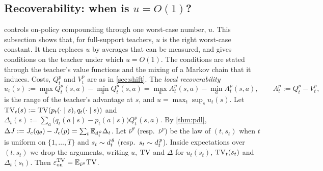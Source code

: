 \subsection{Recoverability: when is \texorpdfstring{$u=O(1)$}{u=O(1)}?}\label{sec:recoverability}

 controls on-policy compounding through one worst-case number, $u$. This subsection shows that,
for full-support teachers, $u$ is the right worst-case constant. It then replaces $u$ by averages that can be
measured, and gives conditions on the teacher under which $u=O(1)$. The conditions are stated through the
teacher's value functions and the mixing of a Markov chain that it induces. Costs, $Q^p_t$ and $V^p_t$ are as in
\cref{sec:shift}. The \emph{local recoverability}
\[
u_t(s):=\max_aQ^p_t(s,a)-\min_aQ^p_t(s,a)=\max_aA^p_t(s,a)-\min_aA^p_t(s,a),\qquad A^p_t:=Q^p_t-V^p_t,
\]
is the range of the teacher's advantage at $s$, and $u=\max_t\sup_su_t(s)$. Let
$\mathrm{TV}_t(s):=\mathrm{TV}(p_t(\cdot\mid s),q_t(\cdot\mid s))$ and $\Delta_t(s):=\sum_a\big(q_t(a\mid s)-p_t(a\mid s)\big)Q^p_t(s,a)$. By
\cref{thm:pdl}, $\Delta J:=J_c(q_\theta)-J_c(p)=\sum_t\mathbb{E}_{d^{\,\theta}_{t}}\Delta_t$. Let $\bar\nu^\theta$ (resp.\ $\bar\nu^p$) be the law of $(t,s_t)$
when $t$ is uniform on $\{1,\dots,T\}$ and $s_t\sim d^{\,\theta}_{t}$ (resp.\ $s_t\sim d^{\,p}_{t}$). Inside expectations over $(t,s_t)$ we
drop the arguments, writing $u$, $\mathrm{TV}$ and $\Delta$ for $u_t(s_t)$, $\mathrm{TV}_t(s_t)$ and $\Delta_t(s_t)$. Then $\varepsilon_{\mathrm{on}}^{\mathrm{TV}}=\mathbb{E}_{\bar\nu^\theta}\mathrm{TV}$.

